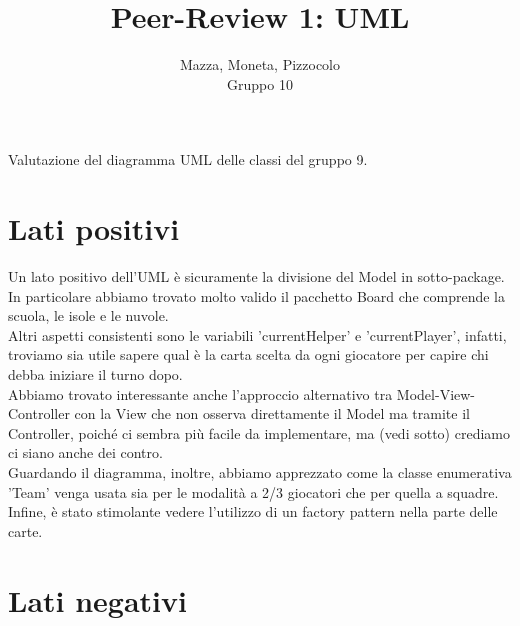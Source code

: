 \documentclass[12pt]{article}
\title{Peer-Review 1: UML}
\author{Mazza, Moneta, Pizzocolo\\Gruppo 10}
\begin{document}
\maketitle

Valutazione del diagramma UML delle classi del gruppo 9.

\section{Lati positivi}

Un lato positivo dell'UML è sicuramente la divisione del Model in sotto-package. In particolare abbiamo trovato molto valido il pacchetto Board che comprende la scuola, le isole e le nuvole.\\Altri aspetti consistenti sono le variabili 'currentHelper' e 'currentPlayer', infatti, troviamo sia utile sapere qual è la carta scelta da ogni giocatore per capire chi debba iniziare il turno dopo.\\Abbiamo trovato interessante anche l'approccio alternativo tra Model-View-Controller con la View che non osserva direttamente il Model ma tramite il Controller, poiché ci sembra più facile da implementare, ma (vedi sotto) crediamo ci siano anche dei contro.\\Guardando il diagramma, inoltre, abbiamo apprezzato come la classe enumerativa 'Team' venga usata sia per le modalità a 2/3 giocatori che per quella a squadre.\\Infine, è stato stimolante vedere l'utilizzo di un factory pattern nella parte delle carte.


\section{Lati negativi}
\end{document}
